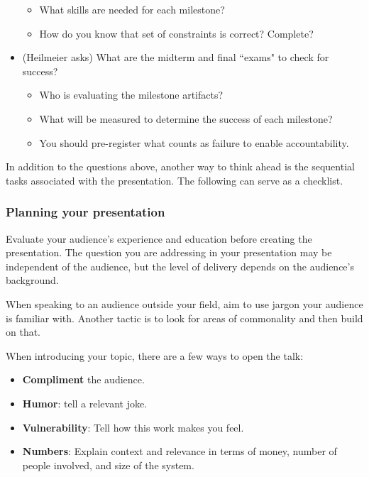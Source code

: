 \begin{itemize}
\begin{itemize}
        \item What skills are needed for each milestone?
        \item How do you know that set of constraints is correct? Complete?
    \end{itemize}
    \item (Heilmeier asks) What are the midterm and final ``exams" to check for success?
    \begin{itemize}
        \item Who is evaluating the milestone artifacts?
        \item What will be measured to determine the success of each milestone?
        \item You should pre-register what counts as failure to enable accountability.
    \end{itemize}
\end{itemize}








In addition to the questions above, another way to think ahead is the sequential tasks associated with the presentation. 
The following can serve as a checklist.

\subsubsection*{Planning your presentation}

Evaluate your audience's experience and education before creating the presentation. The question you are addressing in your presentation may be independent of the audience, but the level of delivery depends on the audience's background.

When speaking to an audience outside your field, aim to use jargon your audience is familiar with. Another tactic is to look for areas of commonality and then build on that.

When introducing your topic, there are a few ways to open the talk:
\begin{itemize}
    \item \textbf{Compliment} the audience.
    \item \textbf{Humor}: tell a relevant joke.
    \item \textbf{Vulnerability}: Tell how this work makes you feel.
    \item \textbf{Numbers}: Explain context and relevance in terms of money, number of people involved, and size of the system.
\end{itemize}


